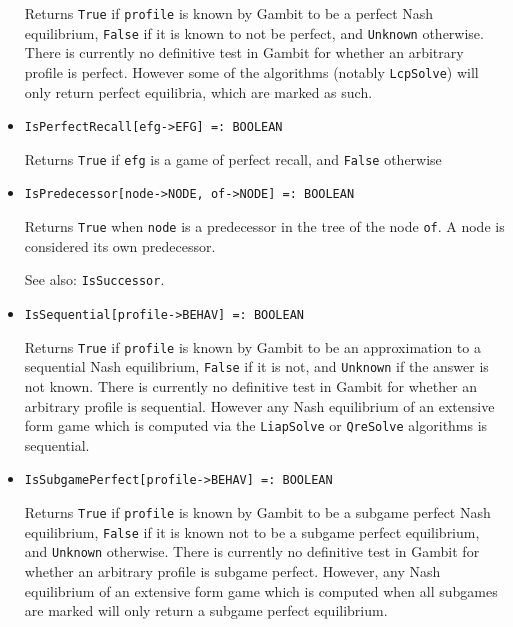 \begin{itemize}
\bd 
Returns \verb+True+ if \verb+profile+ is known by Gambit to be a
perfect Nash equilibrium, \verb+False+ if it is known to not be
perfect, and \verb+Unknown+ otherwise.  There is currently no
definitive test in Gambit for whether an arbitrary profile is perfect.
However some of the algorithms (notably \verb+LcpSolve+) will only
return perfect equilibria, which are marked as such.   
\ed

\item{}
\protect \large \begin{verbatim}
IsPerfectRecall[efg->EFG] =: BOOLEAN 
\end{verbatim}\normalsize

\bd 
Returns \verb+True+ if \verb+efg+ is a game of perfect recall, and
\verb+False+ otherwise 
\ed


\item{}
\protect \large \begin{verbatim}
IsPredecessor[node->NODE, of->NODE] =: BOOLEAN 
\end{verbatim}\normalsize

\bd
Returns \verb+True+ when \verb+node+ is a predecessor
in the tree of the node \verb+of+.  A node is considered its own predecessor.
\item [See also:] \verb+IsSuccessor+.
\ed

\item{}
\protect \large \begin{verbatim}
IsSequential[profile->BEHAV] =: BOOLEAN 
\end{verbatim}\normalsize

\bd 
Returns \verb+True+ if \verb+profile+
is known by Gambit to be an approximation to a
sequential Nash equilibrium, \verb+False+ if it is not, and \verb+Unknown+ if the answer is not known.  There is
currently no definitive test in Gambit for whether an arbitrary
profile is sequential.  However any Nash equilibrium of an extensive
form game which is computed via the \verb+LiapSolve+ or
\verb+QreSolve+ algorithms is sequential.
\ed

\item{}
\protect \large \begin{verbatim}
IsSubgamePerfect[profile->BEHAV] =: BOOLEAN 
\end{verbatim}\normalsize

\bd
Returns \verb+True+ if \verb+profile+
is known by Gambit to be a subgame perfect Nash
equilibrium, \verb+False+ if it is known not to be a subgame perfect equilibrium, and \verb+Unknown+ otherwise.  There is currently no
definitive test in Gambit for whether an arbitrary profile is subgame
perfect.  However, any Nash equilibrium of an extensive form game which
is computed when all subgames are marked will only return a subgame
perfect equilibrium.  
\ed


\end{itemize}
